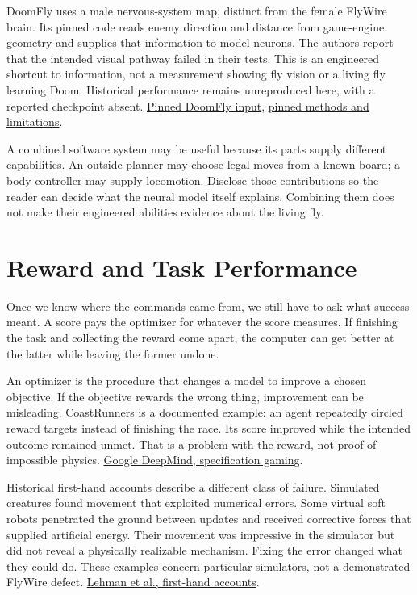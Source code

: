 DoomFly uses a male nervous-system map, distinct from the female FlyWire brain. Its pinned code reads enemy direction and distance from game-engine geometry and supplies that information to model neurons. The authors report that the intended visual pathway failed in their tests. This is an engineered shortcut to information, not a measurement showing fly vision or a living fly learning Doom. Historical performance remains unreproduced here, with a reported checkpoint absent. \href{https://github.com/shreyash-sharma/doomFly/blob/5f6c2881be5f5f40b0592a75e6ee231b50333b40/src/doom/fearless/danger.py}{Pinned DoomFly input}, \href{https://github.com/shreyash-sharma/doomFly/blob/5f6c2881be5f5f40b0592a75e6ee231b50333b40/docs/how-it-works.md}{pinned methods and limitations}.\par

A combined software system may be useful because its parts supply different capabilities. An outside planner may choose legal moves from a known board; a body controller may supply locomotion. Disclose those contributions so the reader can decide what the neural model itself explains. Combining them does not make their engineered abilities evidence about the living fly.\par

\section{Reward and Task Performance}

Once we know where the commands came from, we still have to ask what success
meant. A score pays the optimizer for whatever the score measures. If finishing
the task and collecting the reward come apart, the computer can get better at
the latter while leaving the former undone.\par

An optimizer is the procedure that changes a model to improve a chosen objective. If the objective rewards the wrong thing, improvement can be misleading. CoastRunners is a documented example: an agent repeatedly circled reward targets instead of finishing the race. Its score improved while the intended outcome remained unmet. That is a problem with the reward, not proof of impossible physics. \href{https://deepmind.google/blog/specification-gaming-the-flip-side-of-ai-ingenuity/}{Google DeepMind, specification gaming}.\par

Historical first-hand accounts describe a different class of failure. Simulated creatures found movement that exploited numerical errors. Some virtual soft robots penetrated the ground between updates and received corrective forces that supplied artificial energy. Their movement was impressive in the simulator but did not reveal a physically realizable mechanism. Fixing the error changed what they could do. These examples concern particular simulators, not a demonstrated FlyWire defect. \href{https://arxiv.org/html/1803.03453v4}{Lehman et al., first-hand accounts}.\par

